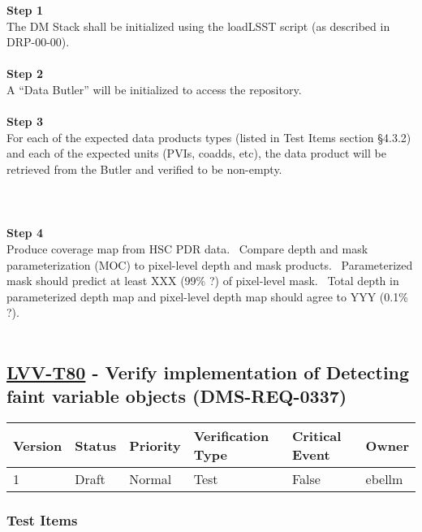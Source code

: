 \textbf{Step 1}\\
The DM Stack shall be initialized using the loadLSST script (as
described in DRP-00-00).\\
~\\
\textbf{Step 2}\\
A ``Data Butler'' will be initialized to access the repository.\\
~\\
\textbf{Step 3}\\
For each of the expected data products types (listed in Test Items
section §4.3.2) and each of the expected units (PVIs, coadds, etc), the
data product will be retrieved from the Butler and verified to be
non-empty.\\
~\\
~\\
~\\
\textbf{Step 4}\\
Produce coverage map from HSC PDR data. ~Compare depth and mask
parameterization (MOC) to pixel-level depth and mask products.
~Parameterized mask should predict at least XXX (99\% ?) of pixel-level
mask. ~Total depth in parameterized depth map and pixel-level depth map
should agree to YYY (0.1\% ?).\\
~\\

\hypertarget{lvv-t80---verify-implementation-of-detecting-faint-variable-objects-dms-req-0337}{%
\subsection{\texorpdfstring{\href{https://jira.lsstcorp.org/secure/Tests.jspa\#/testCase/LVV-T80}{LVV-T80}
- Verify implementation of Detecting faint variable objects
(DMS-REQ-0337)}{LVV-T80 - Verify implementation of Detecting faint variable objects (DMS-REQ-0337)}}\label{lvv-t80---verify-implementation-of-detecting-faint-variable-objects-dms-req-0337}}

\begin{longtable}[]{@{}llllll@{}}
\toprule
Version & Status & Priority & Verification Type & Critical Event &
Owner\tabularnewline
\midrule
\endhead
1 & Draft & Normal & Test & False & ebellm\tabularnewline
\bottomrule
\end{longtable}

\hypertarget{test-items-33}{%
\subsubsection{Test Items}\label{test-items-33}}

